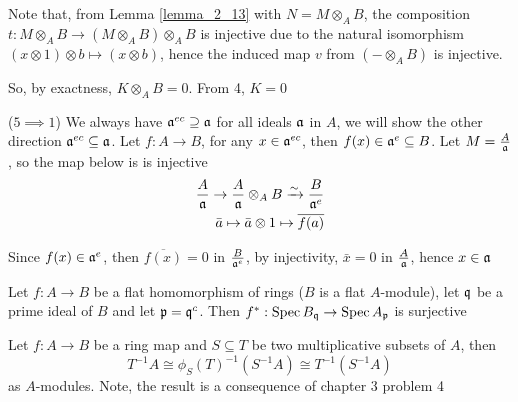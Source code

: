 \begin{longproof}
	Note that, from Lemma \ref{lemma_2_13} with $N = M \otimes_A B$, the composition $t: M \otimes_A B \to (M \otimes_A B ) \otimes_A B$ is injective due to the natural isomorphism $(x \otimes 1) \otimes b \mapsto (x \otimes b)$, hence the induced map $v$ from $(- \otimes_A B)$ is injective.
	\begin{center}
	\end{center}
	
	So, by exactness, $K \otimes_A B = 0$. From 4, $K = 0$
	
	($5 \implies 1$) We always have $\mathfrak{a}^{ec} \supseteq \mathfrak{a}$ for all ideals $\mathfrak{a}$ in $A$, we will show the other direction $\mathfrak{a}^{ec} \subseteq \mathfrak{a}$. Let $f: A \to B$, for any $x \in \mathfrak{a}^{ec}$, then $f(x) \in \mathfrak{a}^e \subseteq B$. Let $M = \frac{A}{\mathfrak{a}}$, so the map below is is injective
	\begin{align*}
		\frac{A}{\mathfrak{a}} \to \frac{A}{\mathfrak{a}} \otimes_A B \xrightarrow{\sim} \frac{B}{\mathfrak{a}^e} \\
		\bar{a} \mapsto \bar{a} \otimes 1 \mapsto \overline{f(a)}
	\end{align*}
	
	Since $f(x) \in \mathfrak{a}^e$, then $\overline{f(x)} = 0$ in $\frac{B}{\mathfrak{a}^e}$, by injectivity, $\bar{x} = 0$ in $\frac{A}{\mathfrak{a}}$, hence $x \in \mathfrak{a}$
	
\end{longproof}

\begin{problem}
	Let $f: A \to B$ be a flat homomorphism of rings ($B$ is a flat $A$-module), let $\mathfrak{q}$ be a prime ideal of $B$ and let $\mathfrak{p} = \mathfrak{q}^c$. Then $f^*: \operatorname{Spec} B_{\mathfrak{q}} \to \operatorname{Spec} A_{\mathfrak{p}}$ is surjective
\end{problem}

\begin{lemma}
	\label{lemma_contain}
	Let $f: A \to B$ be a ring map and $S \subseteq T$ be two multiplicative subsets of $A$, then
	$$
		T^{-1} A \cong \phi_S(T)^{-1} (S^{-1} A) \cong T^{-1} (S^{-1} A)
	$$
	as $A$-modules. Note, the result is a consequence of chapter 3 problem 4
\end{lemma}


